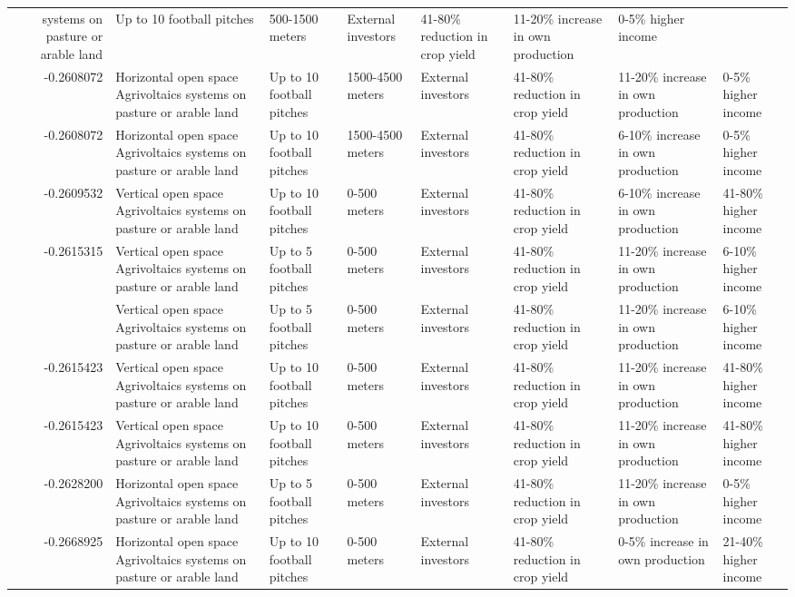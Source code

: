 \begin{table}
\begin{tabular}[t]{rlllllll}
systems on pasture or arable land & Up to 10 football pitches & 500-1500 meters & External investors & 41-80\% reduction in crop yield & 11-20\% increase in own production & 0-5\% higher income\\
-0.2608072 & Horizontal open space Agrivoltaics
systems on pasture or arable land & Up to 10 football pitches & 1500-4500 meters & External investors & 41-80\% reduction in crop yield & 11-20\% increase in own production & 0-5\% higher income\\
-0.2608072 & Horizontal open space Agrivoltaics
systems on pasture or arable land & Up to 10 football pitches & 1500-4500 meters & External investors & 41-80\% reduction in crop yield & 6-10\% increase in own production & 0-5\% higher income\\
-0.2609532 & Vertical open space Agrivoltaics
systems on pasture or arable land & Up to 10 football pitches & 0-500 meters & External investors & 41-80\% reduction in crop yield & 6-10\% increase in own production & 41-80\% higher income\\
-0.2615315 & Vertical open space Agrivoltaics
systems on pasture or arable land & Up to 5 football pitches & 0-500 meters & External investors & 41-80\% reduction in crop yield & 11-20\% increase in own production & 6-10\% higher income\\
\addlinespace
-0.2615315 & Vertical open space Agrivoltaics
systems on pasture or arable land & Up to 5 football pitches & 0-500 meters & External investors & 41-80\% reduction in crop yield & 11-20\% increase in own production & 6-10\% higher income\\
-0.2615423 & Vertical open space Agrivoltaics
systems on pasture or arable land & Up to 10 football pitches & 0-500 meters & External investors & 41-80\% reduction in crop yield & 11-20\% increase in own production & 41-80\% higher income\\
-0.2615423 & Vertical open space Agrivoltaics
systems on pasture or arable land & Up to 10 football pitches & 0-500 meters & External investors & 41-80\% reduction in crop yield & 11-20\% increase in own production & 41-80\% higher income\\
-0.2628200 & Horizontal open space Agrivoltaics
systems on pasture or arable land & Up to 5 football pitches & 0-500 meters & External investors & 41-80\% reduction in crop yield & 11-20\% increase in own production & 0-5\% higher income\\
-0.2668925 & Horizontal open space Agrivoltaics
systems on pasture or arable land & Up to 10 football pitches & 0-500 meters & External investors & 41-80\% reduction in crop yield & 0-5\% increase in own production & 21-40\% higher income\\

\end{tabular}
\end{table}
